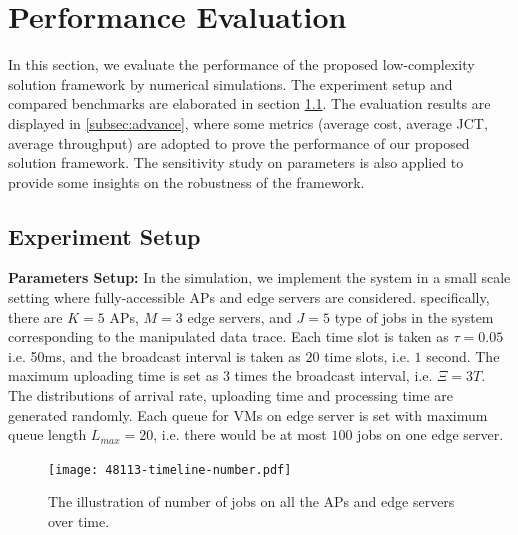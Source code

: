 \section{Performance Evaluation}
\label{sec:evaluation}
In this section, we evaluate the performance of the proposed low-complexity solution framework by numerical simulations.
The experiment setup and compared benchmarks are elaborated in section \ref{subsec:basic}.
The evaluation results are displayed in \ref{subsec:advance}, where some metrics (average cost, average JCT, average throughput) are adopted to prove the performance of our proposed solution framework.
The sensitivity study on parameters is also applied to provide some insights on the robustness of the framework.

\subsection{Experiment Setup}
\label{subsec:basic}
\textbf{Parameters Setup:}
In the simulation, we implement the system in a small scale setting where fully-accessible APs and edge servers are considered.
specifically, there are $K=5$ APs, $M=3$ edge servers, and $J=5$ type of jobs in the system corresponding to the manipulated data trace.
Each time slot is taken as $\tau = 0.05$ i.e. 50ms, and the broadcast interval is taken as $20$ time slots, i.e. $1$ second.
The maximum uploading time is set as $3$ times the broadcast interval, i.e. $\Xi = 3T$.
The distributions of arrival rate, uploading time and processing time are generated randomly.
Each queue for VMs on edge server is set with maximum queue length $L_{max}=20$, i.e. there would be at most $100$ jobs on one edge server.

\begin{figure}[ht!]                                                                            %
    \centering                                                                                  %
    \texttt{[image: 48113-timeline-number.pdf]}                           %
    \caption{The illustration of number of jobs on all the APs and edge servers over time.}     %
    \label{fig:general_timeline}                                                                %
\end{figure}                                                                                   %

